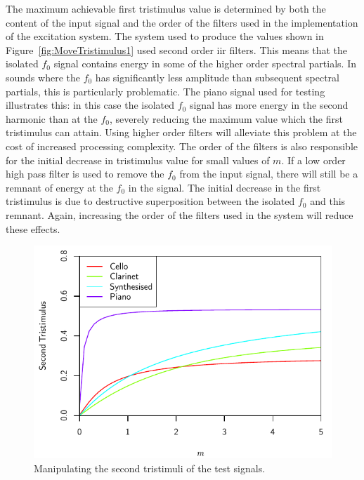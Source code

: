 		The maximum achievable first tristimulus value is determined by both the content of the input signal and
		the order of the filters used in the implementation of the excitation system. The system used to produce
		the values shown in Figure~\ref{fig:MoveTristimulus1} used second order \acrshort{iir} filters. This means
		that the isolated $f_{0}$ signal contains energy in some of the higher order spectral partials. In sounds
		where the $f_{0}$ has significantly less amplitude than subsequent spectral partials, this is particularly
		problematic. The piano signal used for testing illustrates this: in this case the isolated $f_{0}$ signal
		has more energy in the second harmonic than at the $f_{0}$, severely reducing the maximum value which the
		first tristimulus can attain. Using higher order filters will alleviate this problem at the cost of
		increased processing complexity. The order of the filters is also responsible for the initial decrease in
		tristimulus value for small values of $m$. If a low order high pass filter is used to remove the $f_{0}$
		from the input signal, there will still be a remnant of energy at the $f_{0}$ in the signal. The initial
		decrease in the first tristimulus is due to destructive superposition between the isolated $f_{0}$ and this
		remnant. Again, increasing the order of the filters used in the system will reduce these effects.

		\begin{figure}[h!]
			\centering
			\includegraphics{chapter6/Images/MoveTristimulus2.pdf}
			\caption{Manipulating the second tristimuli of the test signals.}
			\label{fig:MoveTristimulus2}
		\end{figure}

